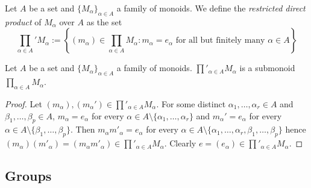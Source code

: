 \begin{definition}
    Let $A$ be a set and $\{M_\alpha\}_{\alpha\in A}$ a family of monoids. We define the \textit{restricted direct product} of $M_\alpha$ over $A$ as the set 
    $$\prod_{\alpha\in A}' M_\alpha := \left\{(m_\alpha) \in \prod_{\alpha\in A} M_\alpha : m_\alpha = e_\alpha \text{ for all but finitely many } \alpha \in A \right\}$$
\end{definition}
\begin{lemma}\label{RestrictedProductMonoidIsAMonoid}
    Let $A$ be a set and $\{M_\alpha\}_{\alpha\in A}$ a family of monoids.  $\prod'_{\alpha\in A} M_\alpha$ is a submonoid $\prod_{\alpha \in A} M_\alpha$.
\end{lemma}
\begin{proof}
    Let $(m_\alpha),(m_\alpha')\in \prod'_{\alpha\in A} M_\alpha$. For some distinct $\alpha_1,\dots,\alpha_r\in A$ and $\beta_1,\dots,\beta_p\in A$, $m_\alpha = e_\alpha$ for every $\alpha \in A\setminus \{\alpha_1,\dots,\alpha_r\}$ and $m_\alpha' = e_\alpha$ for every $\alpha \in A \setminus \{\beta_1,\dots,\beta_p\}$. Then $m_\alpha m'_\alpha = e_\alpha$ for every $\alpha \in A\setminus \{\alpha_1,\dots,\alpha_r,\beta_1,\dots,\beta_p\}$ hence $(m_\alpha)(m'_\alpha)=(m_\alpha m'_\alpha) \in \prod'_{\alpha\in A} M_\alpha$. Clearly $e=(e_\alpha)\in \prod'_{\alpha\in A} M_\alpha$. 
\end{proof}
\subsection{Groups}
